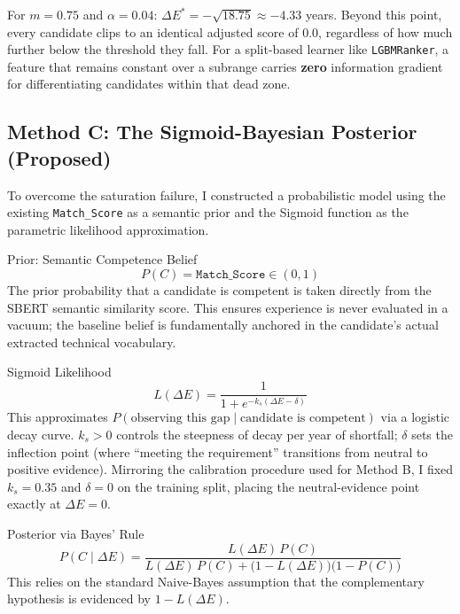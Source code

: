 \vspace{0.5em}

For $m = 0.75$ and $\alpha = 0.04$: $\Delta E^* = -\sqrt{18.75} \approx -4.33$ years. Beyond this point, every candidate clips to an identical adjusted score of $0.0$, regardless of how much further below the threshold they fall. For a split-based learner like \texttt{LGBMRanker}, a feature that remains constant over a subrange carries \textbf{zero} information gradient for differentiating candidates within that dead zone.

\subsection{Method C: The Sigmoid-Bayesian Posterior (Proposed)}
\label{subsec:sigmoid_bayes}

To overcome the saturation failure, I constructed a probabilistic model using the existing \texttt{Match\_Score} as a semantic prior and the Sigmoid function as the parametric likelihood approximation.

\begin{definitionbox}{Prior: Semantic Competence Belief}
\begin{equation}
P(C) = \texttt{Match\_Score} \in (0,1)
\label{eq:prior}
\end{equation}
The prior probability that a candidate is competent is taken directly from the SBERT semantic similarity score. This ensures experience is never evaluated in a vacuum; the baseline belief is fundamentally anchored in the candidate's actual extracted technical vocabulary.
\end{definitionbox}

\begin{definitionbox}{Sigmoid Likelihood}
\begin{equation}
L(\Delta E) = \frac{1}{1 + e^{-k_s(\Delta E - \delta)}}
\label{eq:sigmoid_likelihood}
\end{equation}
This approximates $P(\text{observing this gap} \mid \text{candidate is competent})$ via a logistic decay curve. $k_s > 0$ controls the steepness of decay per year of shortfall; $\delta$ sets the inflection point (where ``meeting the requirement'' transitions from neutral to positive evidence). Mirroring the calibration procedure used for Method B, I fixed $k_s = 0.35$ and $\delta = 0$ on the training split, placing the neutral-evidence point exactly at $\Delta E = 0$.
\end{definitionbox}

\begin{definitionbox}{Posterior via Bayes' Rule}
\begin{equation}
P(C \mid \Delta E) = \frac{L(\Delta E)\, P(C)}{L(\Delta E)\, P(C) + \big(1 - L(\Delta E)\big)\big(1 - P(C)\big)}
\label{eq:bayes_posterior}
\end{equation}
This relies on the standard Naive-Bayes assumption that the complementary hypothesis is evidenced by $1 - L(\Delta E)$.
\end{definitionbox}

